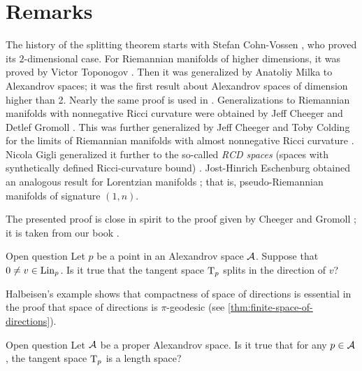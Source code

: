 \section{Remarks}

The history of the splitting theorem starts with Stefan Cohn-Vossen \cite{cohn-vossen_line},
who proved its $2$-dimensional case.
For Riemannian manifolds of higher dimensions,
it was proved by Victor Toponogov \cite{toponogov-globalization+splitting}.
Then it was generalized by Anatoliy Milka \cite{milka-line}
to Alexandrov spaces;
it was the first result about Alexandrov spaces of dimension higher than 2.
Nearly the same proof is used in \cite[1.5]{burago-burago-ivanov}.
Generalizations to Riemannian manifolds with nonnegative Ricci curvature were obtained by Jeff Cheeger and Detlef Gromoll \cite{cheeger-gromoll-split}.
This was further generalized by Jeff Cheeger and Toby Colding for the limits of Riemannian manifolds with almost nonnegative Ricci curvature \cite{cheeger-colding-alm-rigidity}.
Nicola Gigli generalized it further to the so-called {}\emph{RCD spaces} (spaces with synthetically defined Ricci-curvature bound) \cite{gigli2013splitting, gigli-splitting-overview}.
Jost-Hinrich Eschenburg obtained an analogous result for Lorentzian manifolds \cite{eshenburg-split}; that is, pseudo-Riemannian manifolds of signature $(1,n)$.

The presented proof is close in spirit to the proof given by Cheeger and Gromoll \cite{cheeger-gromoll-split};
it is taken from our book \cite{alexander-kapovitch-petrunin2024}.

\begin{thm}{Open question}
Let $p$ be a point in an Alexandrov space $\mathcal{A}$.
Suppose that $0\ne v\in \mathop{\rm Lin}\nolimits_p$.
Is it true that the tangent space $\mathrm{T}_p$ splits in the direction of $v$?
\end{thm}

Halbeisen's example \cite{alexander-kapovitch-petrunin2024,halbeisen} shows that compactness of space of directions is essential in the proof that space of directions is $\pi$-geodesic (see \ref{thm:finite-space-of-directions}).

\begin{thm}{Open question}\label{open:Halb-proper}
Let $\mathcal{A}$ be a proper Alexandrov space.
Is it true that for any $p\in \mathcal{A}$, the tangent space $\mathrm{T}_p$ is a length space?
\end{thm}


